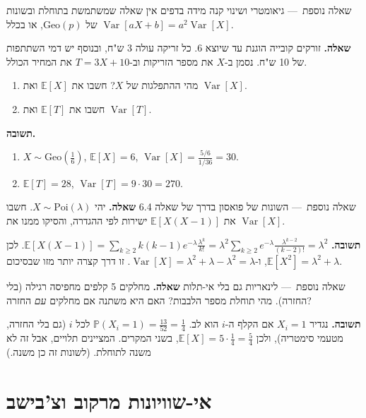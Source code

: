 \documentclass[11pt,a4paper]{report}
\newcommand{\PP}{\mathbb{P}}
\newcommand{\E}{\mathbb{E}}
\DeclareMathOperator{\Var}{Var}
\newcommand{\Geo}{\mathrm{Geo}}
\newcommand{\Poi}{\mathrm{Poi}}
\newcommand{\dash}{{\rmfamily —}}
\begin{document}
\begin{suggestion}{שאלה נוספת~\dash{} גיאומטרי ושינוי קנה מידה}
בדפים אין שאלה שמשתמשת בתוחלת ובשונות של $\Geo(p)$, או בכלל $\Var[aX+b]=a^2\Var[X]$.

\textbf{שאלה.} זורקים קובייה הוגנת עד שיוצא 6. כל זריקה עולה 3 ש"ח, ובנוסף יש דמי השתתפות של 10 ש"ח. נסמן ב-$X$ את מספר הזריקות וב-$T=3X+10$ את המחיר הכולל.
\begin{enumerate}[label=(\alph*),itemsep=1pt,topsep=2pt]
  \item מהי ההתפלגות של $X$? חשבו את $\E[X]$ ואת $\Var[X]$.
  \item חשבו את $\E[T]$ ואת $\Var[T]$.
\end{enumerate}
\textbf{תשובה.}
\begin{enumerate}[label=(\alph*),itemsep=1pt,topsep=2pt]
  \item $X\sim\Geo(\frac16)$, $\E[X]=6$, $\Var[X]=\frac{5/6}{1/36}=30$.
  \item $\E[T]=28$, $\Var[T]=9\cdot30=270$.
\end{enumerate}
\end{suggestion}

\begin{suggestion}{שאלה נוספת~\dash{} השונות של פואסון בדרך של שאלה 6.4}
\textbf{שאלה.} יהי $X\sim\Poi(\lambda)$. חשבו את $\E[X(X-1)]$ ישירות לפי ההגדרה, והסיקו ממנו את $\Var[X]$.

\textbf{תשובה.} $\E[X(X-1)]=\sum_{k\ge2}k(k-1)e^{-\lambda}\frac{\lambda^k}{k!}=\lambda^2\sum_{k\ge2}e^{-\lambda}\frac{\lambda^{k-2}}{(k-2)!}=\lambda^2$. לכן $\E[X^2]=\lambda^2+\lambda$, ו-$\Var[X]=\lambda^2+\lambda-\lambda^2=\lambda$. זו דרך קצרה יותר מזו שבסיכום.
\end{suggestion}

\begin{suggestion}{שאלה נוספת~\dash{} לינאריות גם בלי אי-תלות}
\textbf{שאלה.} מחלקים 5 קלפים מחפיסה רגילה (בלי החזרה). מהי תוחלת מספר הלבבות? האם היא משתנה אם מחלקים \emph{עם} החזרה?

\textbf{תשובה.} נגדיר $X_i=1$ אם הקלף ה-$i$ הוא לב. $\PP(X_i=1)=\frac{13}{52}=\frac14$ לכל $i$ (גם בלי החזרה, מטעמי סימטריה), ולכן $\E[X]=5\cdot\frac14=\frac54$, בשני המקרים. המציינים תלויים, אבל זה לא משנה לתוחלת. (לשונות זה כן משנה.)
\end{suggestion}


\chapter{אי-שוויונות מרקוב וצ'בישב}
\end{document}
